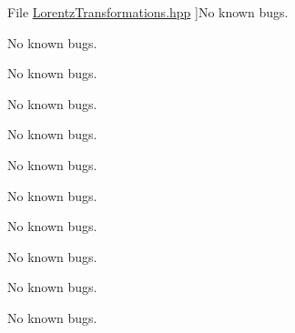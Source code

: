 \begin{DoxyRefList}
%
File \hyperlink{_lorentz_transformations_8hpp}{Lorentz\+Transformations.hpp} ]No known bugs.  
\item[\label{bug__bug000036}%
\Hypertarget{bug__bug000036}%
File \hyperlink{_lorentz_transformations_8inl}{Lorentz\+Transformations.inl} ]No known bugs.  
\item[\label{bug__bug000011}%
\Hypertarget{bug__bug000011}%
File \hyperlink{_luminosity_8hpp}{Luminosity.hpp} ]No known bugs.  
\item[\label{bug__bug000012}%
\Hypertarget{bug__bug000012}%
File \hyperlink{_luminosity_8inl}{Luminosity.inl} ]No known bugs.  
\item[\label{bug__bug000027}%
\Hypertarget{bug__bug000027}%
File \hyperlink{_optics_8hpp}{Optics.hpp} ]No known bugs.  
\item[\label{bug__bug000028}%
\Hypertarget{bug__bug000028}%
File \hyperlink{_optics_constants_8hpp}{Optics\+Constants.hpp} ]No known bugs.  
\item[\label{bug__bug000013}%
\Hypertarget{bug__bug000013}%
File \hyperlink{_orbital_charecteristics_8hpp}{Orbital\+Charecteristics.hpp} ]No known bugs.  
\item[\label{bug__bug000014}%
\Hypertarget{bug__bug000014}%
File \hyperlink{_orbital_charecteristics_8inl}{Orbital\+Charecteristics.inl} ]No known bugs.  
\item[\label{bug__bug000009}%
\Hypertarget{bug__bug000009}%
File \hyperlink{_periapsis_8hpp}{Periapsis.hpp} ]No known bugs. 

No known bugs.  
\item[\label{bug__bug000010}%
\Hypertarget{bug__bug000010}%
File \hyperlink{_periapsis_8inl}{Periapsis.inl} ]No known bugs. 


\end{DoxyRefList}
